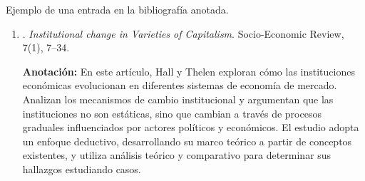 \documentclass[11pt]{article}
\begin{document}
Ejemplo de una entrada en la bibliografía anotada.

\begin{enumerate}
  \item \citet{hall2009institutional}. \emph{Institutional change in Varieties of Capitalism}. Socio-Economic Review, 7(1), 7--34.

  \textbf{Anotación:} En este artículo, Hall y Thelen exploran cómo las instituciones económicas evolucionan en diferentes sistemas de economía de mercado. Analizan los mecanismos de cambio institucional y argumentan que las instituciones no son estáticas, sino que cambian a través de procesos graduales influenciados por actores políticos y económicos. El estudio adopta un enfoque deductivo, desarrollando su marco teórico a partir de conceptos existentes, y utiliza análisis teórico y comparativo para determinar sus hallazgos estudiando casos.
\end{enumerate}

\printbibliography[title={Bibliografía}, heading=subbibliography]
\end{document}
